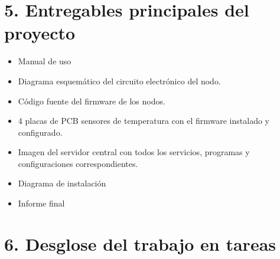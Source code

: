 \documentclass[11pt]{proyecto}
\begin{document}
\section{5. Entregables principales del proyecto}
\label{sec:entregables}

\begin{itemize}
\item Manual de uso
\item Diagrama esquemático del circuito electrónico del nodo.
\item Código fuente del firmware de los nodos.
\item 4 placas de PCB sensores de temperatura con el firmware instalado y configurado.
\item Imagen del servidor central con todos los servicios, programas y configuraciones correspondientes.
\item Diagrama de instalación
\item Informe final

\end{itemize}


\section{6. Desglose del trabajo en tareas}
\label{sec:wbs}
\end{document}
